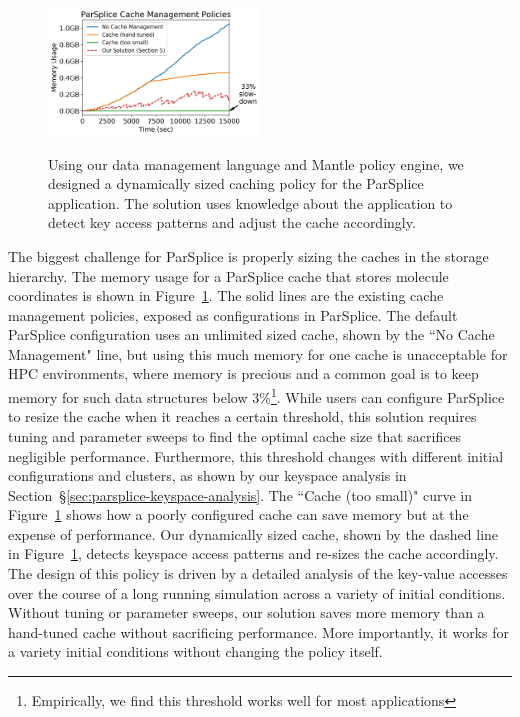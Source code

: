 \begin{figure}[t]
\noindent\includegraphics[width=0.5\textwidth]{figures/cache-management.png}\\

\caption{Using our data management language and Mantle policy engine, we
designed a dynamically sized caching policy for the ParSplice application. The
solution uses knowledge about the application to detect key access patterns and
adjust the cache accordingly. 
\label{fig:cache-management}}
\end{figure}

The biggest challenge for ParSplice is properly sizing the caches in the
storage hierarchy.  The memory usage for a ParSplice cache that stores molecule
coordinates is shown in Figure~\ref{fig:cache-management}. The solid lines are
the existing cache management policies, exposed as configurations in ParSplice.
The default ParSplice configuration uses an unlimited sized cache, shown by the
``No Cache Management" line, but using this much memory for one cache is
unacceptable for HPC environments, where memory is precious and a common goal
is to keep memory for such data structures below 3\%\footnote{Empirically, we
find this threshold works well for most applications}.  While users can
configure ParSplice to resize the cache when it reaches a certain threshold,
this solution requires tuning and parameter sweeps to find the optimal cache
size that sacrifices negligible performance.  Furthermore, this threshold
changes with different initial configurations and clusters, as shown by our
keyspace analysis in Section~\S\ref{sec:parsplice-keyspace-analysis}.  The
``Cache (too small)" curve in Figure~\ref{fig:cache-management} shows how a
poorly configured cache can save memory but at the expense of performance.  Our
dynamically sized cache, shown by the dashed line in
Figure~\ref{fig:cache-management}, detects keyspace access patterns and
re-sizes the cache accordingly. The design of this policy is driven by a
detailed analysis of the key-value accesses over the course of a long running
simulation across a variety of initial conditions.  Without tuning or parameter
sweeps, our solution saves more memory than a hand-tuned cache without
sacrificing performance.  More importantly, it works for a variety initial
conditions without changing the policy itself.

